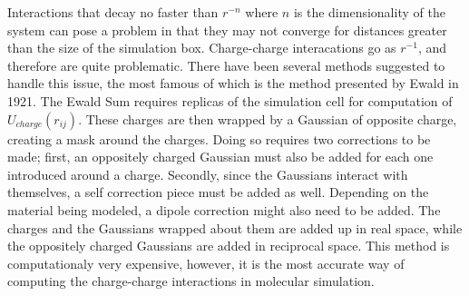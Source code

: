 
Interactions that decay no faster than $r^{-n}$ where $n$ is the
dimensionality of the system can pose a problem in that they may not
converge for distances greater than the size of the simulation
box. Charge-charge interacations go as $r^{-1}$, and therefore are
quite problematic. There have been several methods suggested to handle
this issue, the most famous of which is the method presented by Ewald
in 1921. The Ewald Sum requires replicas of the simulation cell for
computation of $U_{charge}(r_{ij})$. These charges are then wrapped by
a Gaussian of opposite charge, creating a mask around the
charges. Doing so requires two corrections to be made; first, an
oppositely charged Gaussian must also be added for each one introduced
around a charge. Secondly, since the Gaussians interact with
themselves, a self correction piece must be added as well. Depending
on the material being modeled, a dipole correction might also need to
be added. The charges and the Gaussians wrapped about them are added
up in real space, while the oppositely charged Gaussians are added in
reciprocal space. This method is computationaly very expensive,
however, it is the most accurate way of computing the charge-charge
interactions in molecular simulation. 

